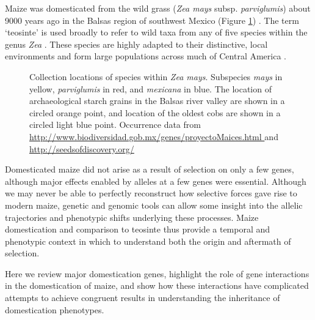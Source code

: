 \documentclass[9pt,twocolumn,twoside]{rilabRxiv}
\begin{document}
﻿Maize was domesticated from the wild grass (\textit{Zea mays} subsp. \textit{parviglumis}) about 9000 years ago in the Balsas region of southwest Mexico (Figure \ref{fig:map}) \citep{matsuoka2002, piperno2009}.
The term `teosinte' is used broadly to refer to wild taxa from any of five species within the genus \textit{Zea} \citep{doebley1980, iltis1980}.
These species are highly adapted to their distinctive, local environments \citep{hufford2012maxent, hufford2012review} and form large populations across much of Central America \citep{wilkes1967}.


   \begin{figure}
        \caption{\label{fig:map} Collection locations of species within \textit{Zea mays}. Subspecies \textit{mays} in yellow, \textit{parviglumis} in red, and \textit{mexicana} in blue. The location of archaeological starch grains \citep{piperno2009} in the Balsas river valley are shown in a circled orange point, and location of the oldest cobs \citep{benz2001} are shown in a circled light blue point. Occurrence data from \url{http://www.biodiversidad.gob.mx/genes/proyectoMaices.html
} and \url{http://seedsofdiscovery.org/}}
\end{figure}


﻿Domesticated maize did not arise as a result of selection on only a few genes, although major effects enabled by alleles at a few genes were essential.
Although we may never be able to perfectly reconstruct how selective forces gave rise to modern maize, genetic and genomic tools can allow some insight into the allelic trajectories and phenotypic shifts underlying these processes.
Maize domestication and comparison to teosinte thus provide a temporal and phenotypic context in which to understand both the origin and aftermath of selection.

﻿Here we review major domestication genes, highlight the role of gene interactions in the domestication of maize, and show how these interactions have complicated attempts to achieve congruent results in understanding the inheritance of domestication phenotypes.
\end{document}
